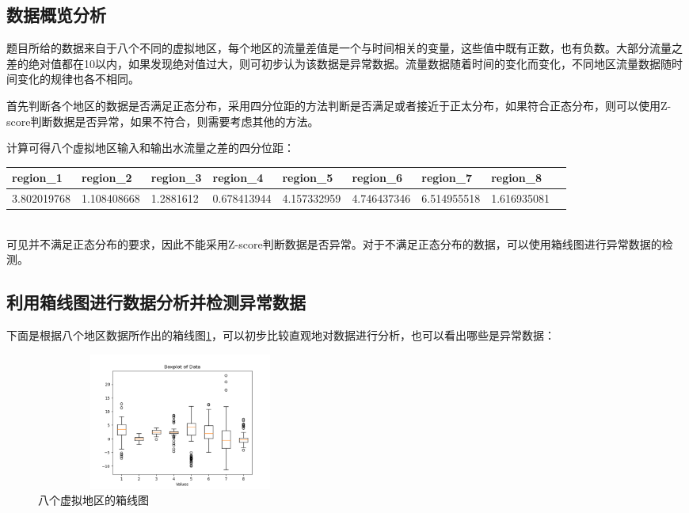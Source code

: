 \documentclass[UTF8]{article}
\begin{document}
	\subsection{数据概览分析}
		\par 题目所给的数据来自于八个不同的虚拟地区，每个地区的流量差值是一个与时间相关的变量，这些值中既有正数，也有负数。大部分流量之差的绝对值都在10以内，如果发现绝对值过大，则可初步认为该数据是异常数据。流量数据随着时间的变化而变化，不同地区流量数据随时间变化的规律也各不相同。
		\par 首先判断各个地区的数据是否满足正态分布，采用四分位距的方法判断是否满足或者接近于正太分布，如果符合正态分布，则可以使用Z-score判断数据是否异常，如果不符合，则需要考虑其他的方法。
		\par 计算可得八个虚拟地区输入和输出水流量之差的四分位距：
		\begin{table}[!ht]
    \centering
	\resizebox{0.8\textwidth}{!}
	{
    \begin{tabular}{|l|l|l|l|l|l|l|l|l|}
    \hline
        region\_1 & region\_2 & region\_3 & region\_4 & region\_5 & region\_6 & region\_7 & region\_8 \\ \hline
        3.802019768 & 1.108408668 & 1.2881612 & 0.678413944 & 4.157332959 & 4.746437346 & 6.514955518 & 1.616935081 \\ \hline
    \end{tabular}
	}
	\end{table}
	\\可见并不满足正态分布的要求，因此不能采用Z-score判断数据是否异常。对于不满足正态分布的数据，可以使用箱线图进行异常数据的检测。
	\subsection{利用箱线图进行数据分析并检测异常数据}
	下面是根据八个地区数据所作出的箱线图\ref{Box}，可以初步比较直观地对数据进行分析，也可以看出哪些是异常数据：
\begin{figure}[!h]
\centering %
\includegraphics[height=4.5cm,width=9.5cm]{pictures/BoxPlot.png}
\caption{八个虚拟地区的箱线图}
\label{Box}
\end{figure}
\end{document}
